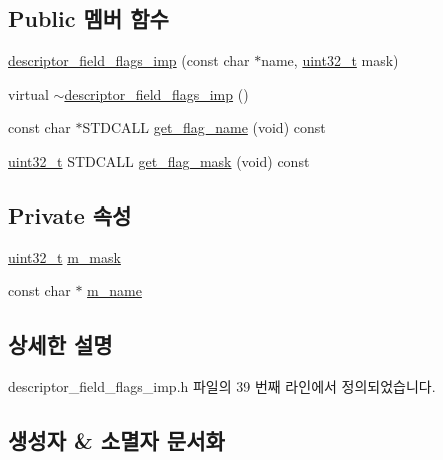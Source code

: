 \subsection*{Public 멤버 함수}
\begin{DoxyCompactItemize}
\item 
\hyperlink{classavdecc__lib_1_1descriptor__field__flags__imp_a2f18e29a0bb0de71ca59ec1b226af91b}{descriptor\+\_\+field\+\_\+flags\+\_\+imp} (const char $\ast$name, \hyperlink{parse_8c_a6eb1e68cc391dd753bc8ce896dbb8315}{uint32\+\_\+t} mask)
\item 
virtual \hyperlink{classavdecc__lib_1_1descriptor__field__flags__imp_a37cd618ec05bd0850f56a5c90b096f06}{$\sim$descriptor\+\_\+field\+\_\+flags\+\_\+imp} ()
\item 
const char $\ast$S\+T\+D\+C\+A\+LL \hyperlink{classavdecc__lib_1_1descriptor__field__flags__imp_a66f8212fab75db2a29cf0ba3499ecd9c}{get\+\_\+flag\+\_\+name} (void) const 
\item 
\hyperlink{parse_8c_a6eb1e68cc391dd753bc8ce896dbb8315}{uint32\+\_\+t} S\+T\+D\+C\+A\+LL \hyperlink{classavdecc__lib_1_1descriptor__field__flags__imp_abc816f0312fe2e8a0150bf9105d622a3}{get\+\_\+flag\+\_\+mask} (void) const 
\end{DoxyCompactItemize}
\subsection*{Private 속성}
\begin{DoxyCompactItemize}
\item 
\hyperlink{parse_8c_a6eb1e68cc391dd753bc8ce896dbb8315}{uint32\+\_\+t} \hyperlink{classavdecc__lib_1_1descriptor__field__flags__imp_afba3f0af06383f1e09233a85fdb70762}{m\+\_\+mask}
\item 
const char $\ast$ \hyperlink{classavdecc__lib_1_1descriptor__field__flags__imp_aabec0ab061a518c77ba7c2925ad46d44}{m\+\_\+name}
\end{DoxyCompactItemize}


\subsection{상세한 설명}


descriptor\+\_\+field\+\_\+flags\+\_\+imp.\+h 파일의 39 번째 라인에서 정의되었습니다.



\subsection{생성자 \& 소멸자 문서화}
